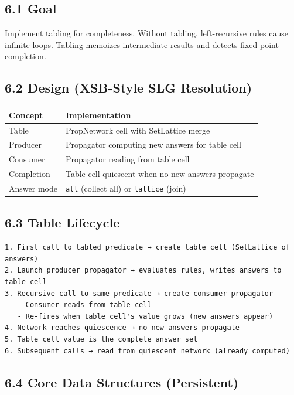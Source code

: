 \documentclass[11pt]{article}
\begin{document}
\subsection{6.1 Goal}
\label{sec:org564a885}

Implement tabling for completeness. Without tabling, left-recursive rules
cause infinite loops. Tabling memoizes intermediate results and detects
fixed-point completion.
\subsection{6.2 Design (XSB-Style SLG Resolution)}
\label{sec:orgb18f8f5}

\begin{center}
\begin{tabular}{ll}
Concept & Implementation\\
\hline
Table & PropNetwork cell with SetLattice merge\\
Producer & Propagator computing new answers for table cell\\
Consumer & Propagator reading from table cell\\
Completion & Table cell quiescent when no new answers propagate\\
Answer mode & \texttt{all} (collect all) or \texttt{lattice} (join)\\
\end{tabular}
\end{center}
\subsection{6.3 Table Lifecycle}
\label{sec:orgaba0770}

\begin{verbatim}
1. First call to tabled predicate → create table cell (SetLattice of answers)
2. Launch producer propagator → evaluates rules, writes answers to table cell
3. Recursive call to same predicate → create consumer propagator
   - Consumer reads from table cell
   - Re-fires when table cell's value grows (new answers appear)
4. Network reaches quiescence → no new answers propagate
5. Table cell value is the complete answer set
6. Subsequent calls → read from quiescent network (already computed)
\end{verbatim}
\subsection{6.4 Core Data Structures (Persistent)}
\label{sec:org6862416}
\end{document}

